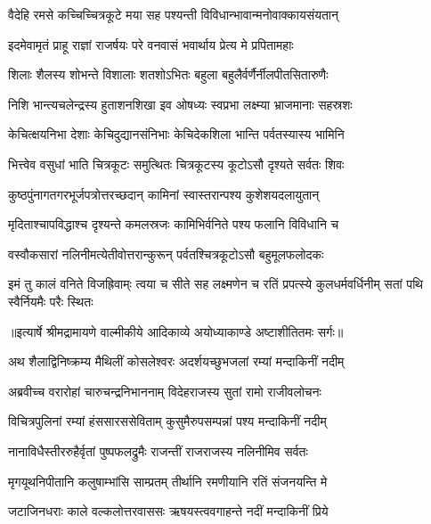 \twolineshloka
{वैदेहि रमसे कच्चिच्चित्रकूटे मया सह}
{पश्यन्ती विविधान्भावान्मनोवाक्कायसंयतान्} %

\twolineshloka
{इदमेवामृतं प्राहू राज्ञां राजर्षयः परे}
{वनवासं भवार्थाय प्रेत्य मे प्रपितामहाः} %

\twolineshloka
{शिलाः शैलस्य शोभन्ते विशालाः शतशोऽभितः}
{बहुला बहुलैर्वर्णैर्नीलपीतसितारुणैः} %

\twolineshloka
{निशि भान्त्यचलेन्द्रस्य हुताशनशिखा इव}
{ओषध्यः स्वप्रभा लक्ष्म्या भ्राजमानाः सहस्रशः} %

\twolineshloka
{केचित्क्षयनिभा देशाः केचिदुद्यानसंनिभाः}
{केचिदेकशिला भान्ति पर्वतस्यास्य भामिनि} %

\twolineshloka
{भित्त्वेव वसुधां भाति चित्रकूटः समुत्थितः}
{चित्रकूटस्य कूटोऽसौ दृश्यते सर्वतः शिवः} %

\twolineshloka
{कुष्ठपुंनागतगरभूर्जपत्रोत्तरच्छदान्}
{कामिनां स्वास्तरान्पश्य कुशेशयदलायुतान्} %

\twolineshloka
{मृदिताश्चापविद्धाश्च दृश्यन्ते कमलस्रजः}
{कामिभिर्वनिते पश्य फलानि विविधानि च} %

\twolineshloka
{वस्वौकसारां नलिनीमत्येतीवोत्तरान्कुरून्}
{पर्वतश्चित्रकूटोऽसौ बहुमूलफलोदकः} %

\fourlineindentedshloka
{इमं तु कालं वनिते विजह्रिवाम्ः}
{त्वया च सीते सह लक्ष्मणेन च}
{रतिं प्रपत्स्ये कुलधर्मवर्धिनीम्}
{सतां पथि स्वैर्नियमैः परैः स्थितः} %


{॥इत्यार्षे श्रीमद्रामायणे वाल्मीकीये आदिकाव्ये अयोध्याकाण्डे अष्टाशीतितमः सर्गः॥}


\twolineshloka
{अथ शैलाद्विनिष्क्रम्य मैथिलीं कोसलेश्वरः}
{अदर्शयच्छुभजलां रम्यां मन्दाकिनीं नदीम्} %

\twolineshloka
{अब्रवीच्च वरारोहां चारुचन्द्रनिभाननाम्}
{विदेहराजस्य सुतां रामो राजीवलोचनः} %

\twolineshloka
{विचित्रपुलिनां रम्यां हंससारससेविताम्}
{कुसुमैरुपसम्पन्नां पश्य मन्दाकिनीं नदीम्} %

\twolineshloka
{नानाविधैस्तीररुहैर्वृतां पुष्पफलद्रुमैः}
{राजन्तीं राजराजस्य नलिनीमिव सर्वतः} %

\twolineshloka
{मृगयूथनिपीतानि कलुषाम्भांसि साम्प्रतम्}
{तीर्थानि रमणीयानि रतिं संजनयन्ति मे} %

\twolineshloka
{जटाजिनधराः काले वल्कलोत्तरवाससः}
{ऋषयस्त्ववगाहन्ते नदीं मन्दाकिनीं प्रिये} %

